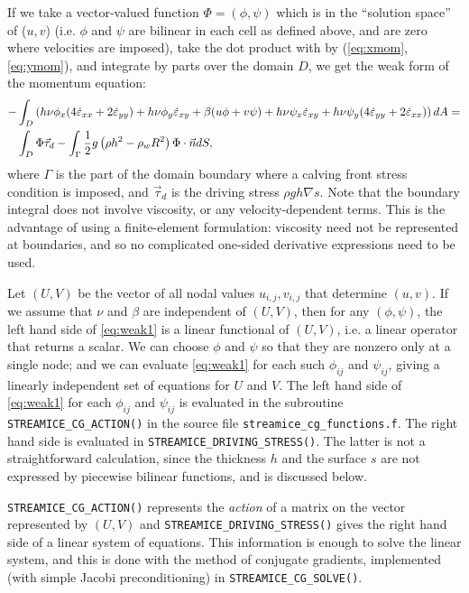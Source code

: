 If we take a vector-valued function $\Phi=(\phi,\psi)$ which is in the
``solution space'' of ($u,v$) (i.e. $\phi$ and $\psi$ are bilinear in each cell
as 
defined above, and are zero where velocities are imposed), take the dot product
with by (\ref{eq:xmom},\ref{eq:ymom}), and integrate by parts over the domain
$D$, we get the weak form of the momentum equation:
\begin{align}
 -&\int_D \left(h\nu\phi_x (4\dot{\varepsilon}_{xx}+2\dot{\varepsilon}_{yy}) +
h\nu\phi_y \dot{\varepsilon}_{xy} + \beta (u\phi + v\psi) +
h\nu\psi_x\dot{\varepsilon}_{xy} + h\nu\psi_y
(4\dot{\varepsilon}_{yy}+2\dot{\varepsilon}_{xx}) \right) dA = \notag \\
\label{eq:weak1}  & \int_D \Phi\vec{\tau}_d - \int_{\Gamma} \frac{1}{2}g
\left(\rho h^2 - \rho_w R^2\right) \Phi\cdot\vec{n} dS,
\end{align}
where $\Gamma$ is the part of the domain boundary where a calving front stress
condition is imposed, and $\vec{\tau}_d$ is the driving stress 
$\rho g h \nabla s$. Note that the boundary integral does not involve viscosity, or any velocity-dependent terms. This is the advantage of using a finite-element
formulation: viscosity need not be represented at boundaries, and so no complicated one-sided derivative expressions need to be used.

Let $(U,V)$ be the vector of all nodal values
$u_{i,j},v_{i,j}$ that determine $(u,v)$. If we assume that $\nu$ and $\beta$
are independent of $(U,V)$, 
then for any $(\phi,\psi)$, the left hand side of 
\eqref{eq:weak1} is a linear functional of $(U,V)$, i.e. a linear operator that
returns a scalar. We can choose $\phi$ and $\psi$ so that they are nonzero
only at a single node; and we can evaluate \eqref{eq:weak1} for each such
$\phi_{ij}$ and $\psi_{ij}$, giving a linearly independent set of equations for
$U$ and $V$. The left hand side of \eqref{eq:weak1} for each $\phi_{ij}$ and
$\psi_{ij}$ is
evaluated in the subroutine \texttt{STREAMICE\_CG\_ACTION()} in the source file
\texttt{streamice\_cg\_functions.f}.
The right hand side is evaluated in \texttt{STREAMICE\_DRIVING\_STRESS()}. The
latter is not a straightforward
calculation, since the thickness $h$ and the surface $s$ are not expressed by
piecewise bilinear functions, and is discussed below.

\texttt{STREAMICE\_CG\_ACTION()} represents the \textit{action} of a matrix on
the vector represented by $(U,V)$ and \texttt{STREAMICE\_DRIVING\_STRESS()} 
gives the right hand side of a linear system of equations. This information is
enough to solve the linear system, and this is done
with the method of conjugate gradients, implemented (with simple Jacobi
preconditioning) in \texttt{STREAMICE\_CG\_SOLVE()}.

